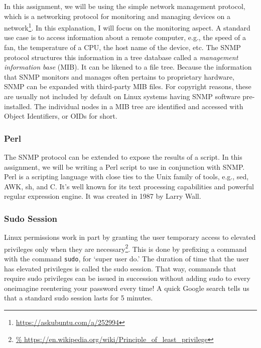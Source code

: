 \documentclass{article}
\begin{document}
In this assignment, we will be using the simple network management protocol,
which is a networking protocol for monitoring and managing devices on a
%
network\footnote{\url{https://askubuntu.com/a/252994}}.
%
In this explanation, I will focus on the monitoring aspect.  A standard use case
is to access information about a remote computer, e.g., the speed of a fan, the
temperature of a CPU, the host name of the device, etc.  The SNMP protocol
structures this information in a tree database called a \emph{management
information base} (MIB). It can be likened to a file tree. Because the
information that SNMP monitors and manages often pertains to proprietary
hardware, SNMP can be expanded with third-party MIB files. For copyright
reasons, these are usually not included by default on Linux systems having SNMP
software pre-installed. The individual nodes in a MIB tree are identified and
accessed with Object Identifiers, or OIDs for short.

\subsubsection{Perl}

The SNMP protocol can be extended to expose the results of a script. In this
assignment, we will be writing a Perl script to use in conjunction with SNMP.
Perl is a scripting language with close ties to the Unix family of tools, e.g.,
sed, AWK, sh, and C. It's well known for its text processing capabilities and
powerful regular expression engine. It was created in 1987 by Larry Wall.

\subsubsection{Sudo Session}

Linux permissions work in part by granting the user temporary access to elevated
privileges only when they are
%
necessary\footnote{\url{%
https://en.wikipedia.org/wiki/Principle_of_least_privilege}}.
%
This is done by prefixing a command with the command \verb|sudo|, for `super
user do.'  The duration of time that the user has elevated privileges is called
the sudo session.  That way, commands that require sudo privileges can be issued
in succession without adding sudo to every one\textemdash imagine reentering
your password every time! A quick Google search tells us that a standard sudo
session lasts for 5 minutes.

\end{document}
